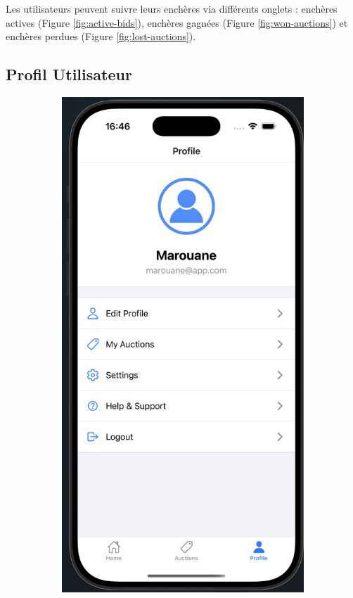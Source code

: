 Les utilisateurs peuvent suivre leurs enchères via différents onglets : enchères actives (Figure \ref{fig:active-bids}), enchères gagnées (Figure \ref{fig:won-auctions}) et enchères perdues (Figure \ref{fig:lost-auctions}).

\subsection{Profil Utilisateur}

\begin{figure}[H]
    \centering
    \begin{subfigure}[b]{0.48\textwidth}
        \includegraphics[width=\textwidth]{images/profile screen.png}

\end{subfigure}
\end{figure}
